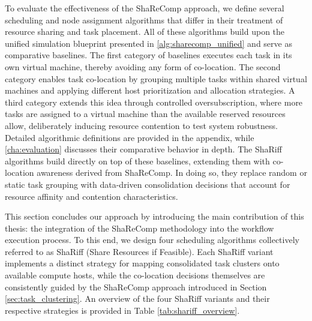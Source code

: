 To evaluate the effectiveness of the ShaReComp approach, we define several scheduling and node assignment algorithms that differ in their treatment of resource sharing and task placement. All of these algorithms build upon the unified simulation blueprint presented in \ref{alg:sharecomp_unified} and serve as comparative baselines. The first category of baselines executes each task in its own virtual machine, thereby avoiding any form of co-location. The second category enables task co-location by grouping multiple tasks within shared virtual machines and applying different host prioritization and allocation strategies. A third category extends this idea through controlled oversubscription, where more tasks are assigned to a virtual machine than the available reserved resources allow, deliberately inducing resource contention to test system robustness. Detailed algorithmic definitions are provided in the appendix, while \ref{cha:evaluation} discusses their comparative behavior in depth. The ShaRiff algorithms build directly on top of these baselines, extending them with co-location awareness derived from ShaReComp. In doing so, they replace random or static task grouping with data-driven consolidation decisions that account for resource affinity and contention characteristics.

\label{sec:co-location_strategies}

This section concludes our approach by introducing the main contribution of this thesis: the integration of the ShaReComp methodology into the workflow execution process. To this end, we design four scheduling algorithms collectively referred to as ShaRiff (Share Resources if Feasible). Each ShaRiff variant implements a distinct strategy for mapping consolidated task clusters onto available compute hosts, while the co-location decisions themselves are consistently guided by the ShaReComp approach introduced in Section \ref{sec:task_clustering}. An overview of the four ShaRiff variants and their respective strategies is provided in Table \ref{tab:shariff_overview}.

